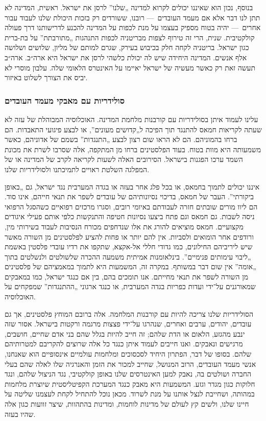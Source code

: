 בנוסף, נכון הוא שאיננו יכולים לקרוא למדינה „שלנו” לרסן את ישראל. ראשית, המדינה לא תתן לנו דבר אלא אם מעמד העובדים~— רובנו, ששורדים רק בזכות היכולת שלנו לעבוד עבור אחרים~— יהיה בטוח מספיק בעצמו על מנת לכפות על המדינה להכנע לדרישותנו דרך פעולה קולקטיבית. שנית, הרי זה טירוף לצפות מבריטניה לכפות התנהגות „מתורבתת” על בת-ברית כגון ישראל. בריטניה לקחה חלק בכיבוש בעירק, שגרם למותם של מליון, שלושים ושלושה אלף אנשים. המדינה היחידה שיש לה יכולת כלשהי לרסן את ישראל היא ארה״ב. ארה״ב תעשה זאת רק כאשר מעשיה של ישראל יאיימו על האינטרס הלאומי שלה. עלבון מוסרי לא יביס את הצורך לשלוט באיזור.

\subsubsection*{סולידריות עם מאבקי מעמד העובדים}

עלינו לעמוד איתן בסולידריות עם קורבנות מלחמת המדינה. האוכלוסיה המבוהלת של עזה לא שעתה לקריאות חמאס להתנגד תוך הפיכה ל„קדושים מעונים”, או לבצע פיגועי התאבדות. הם ברחו בהמוניהם. הם לא הראו שום רצון לבצע „התנגדות” בשמם של אדוניהם, כאשר משמעותה היא מוות בטוח. בעוד הפלסטינים ברחו מן המתקפה, אלה שסרבו לשרת את מכונת השמד ערכו הפגנות בישראל. הסירובים האלה לשעות לקריאה לקרב של המדינה או של המפלגה השלטת ראויים לתמיכתנו ולסולידריות שלנו.

איננו יכולים לתמוך בחמאס, או בכל פלג אחר בעזה או בגדה המערבית נגד ישראל, גם „באופן ביקורתי”. העבר של חמאס, בדיכוי נסיונותיהם של עובדים לשפר את תנאי חייהם, אינו סוד. הם ליוו מורים שובתים חזרה לעבודתם באיומי רובים, וסגרו מרכזים רפואיים כשהסגל הרפואי ניסה לשבות. גם חמאס וגם פתח ביצעו נסיונות חטיפה והתנקשות כלפי אותם פעילי איגודים מקצועיים. חמאס מוציאים להורג את אלו שנדחפים מכורח הנסיבות לעבוד בשירותי מין, ורודפים אחר הומואים ולסביות. אין להם יותר או פחות להציע לפלסטינים מן השורה מאשר שיש ליריביהם החילונים, כמו גדודי חללי אל-אקצא, שתקפו את רדיו עובדי פלסטין באשמת „ליבוי עימותים פנימיים”. בינלאומנות אמיתית משמעה ההכרה שלשולטים ולנשלטים בתוך „אומה” אין שום דבר במשותף. במקרה זה, המשמעות היא לתמוך במאמציהם של פלסטינים מן השורה לשפר את תנאי מחייתם. אנו תומכים בהם, בין אם כנגד ישראל, כמו במאבקים שמאורגנים על־ידי ועדות כפריות בגדה המערבית, או כנגד ארגוני „ההתנגדות” שמפקחים על האוכלוסיה.

הסולידריות שלנו צריכה להיות עם קורבנות המלחמה. אלה ברובם המוחץ פלסטינים, אך גם עובדים, יהודים, ערבים ואחרים, שנהרגו על־ידי פצצות מרגמה ורקטות בישראל. אסור שזה ינבע מהגזע, הלאום או הדת שלהם; זה חייב להיות בגלל שהם בני אדם שחיים, חושבים, מרגישים ונאבקים. ואנו חייבים לעמוד איתן כנגד כל אלה שרוצים להקריבם למטרותיהם שלהם. בסופו של דבר, הפתרון היחיד לסכסוכים ומלחמות עולמיים אינסופיים הוא שאנחנו, אנשי מעמד העובדים, הרוב המנושל, שחייב למכור את הזמן והאנרגיה שלו לאלה שהם בעלי החברה ושולטים בה, נאבק למען האינטרסים שלנו באופן קולקטיבי, נגד הניצול שלהם, ונגד חלוקות כגון מגדר וגזע. המשמעות היא מאבק כנגד המערכת הקפיטליסטית שיוצרת מלחמות במהותה, ושחייבת לנצל אותנו על מנת לשרוד. מכאן נוכל להתחיל לקחת לעצמנו שליטה על חיינו שלנו, ולשים קץ לעולם של מדינות לוחמות, ומדינות בהתהוות, שיצר זוועות כגון אלה שהיו בעזה.

